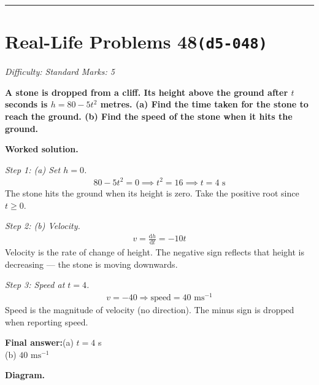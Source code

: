 \documentclass[11pt]{article}
\newcommand{\question}[1]{\par\medskip\noindent\textbf{#1}\par}
\begin{document}
\medskip\hrule

\section*{Real-Life Problems 48\quad\small\texttt{(d5-048)}}
\textit{Difficulty: Standard \quad\textbar\quad Marks: 5}

\question{A stone is dropped from a cliff. Its height above the ground after \( t \) seconds is \( h = 80 - 5t^2 \) metres. (a) Find the time taken for the stone to reach the ground. (b) Find the speed of the stone when it hits the ground.}

\textbf{Worked solution.}

\textit{Step 1: (a) Set \( h = 0 \).}
\[\begin{gathered}
80 - 5t^2 = 0 \implies t^2 = 16 \implies t = 4 \text{ s}
\end{gathered}\]
The stone hits the ground when its height is zero. Take the positive root since \( t \ge 0 \).

\textit{Step 2: (b) Velocity.}
\[\begin{gathered}
v = \frac{\mathrm{d}h}{\mathrm{d}t} = -10t
\end{gathered}\]
Velocity is the rate of change of height. The negative sign reflects that height is decreasing --- the stone is moving downwards.

\textit{Step 3: Speed at \( t = 4 \).}
\[\begin{gathered}
v = -40 \Rightarrow \text{speed} = 40 \text{ ms}^{-1}
\end{gathered}\]
Speed is the magnitude of velocity (no direction). The minus sign is dropped when reporting speed.

\begin{answerbox}
\textbf{Final answer:}\quad (a) \(\displaystyle  t = 4 \) s \\[3pt]  (b) \(\displaystyle  40 \text{ ms}^{-1} \)
\end{answerbox}
\textbf{Diagram.}
\end{document}
